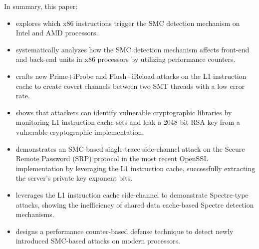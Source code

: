 In summary, this paper:

\begin{itemize}
    \item explores which x86 instructions trigger the SMC detection mechanism on Intel and AMD processors. 
    \item systematically analyzes how the SMC detection mechanism affects front-end and back-end units in x86 processors by utilizing performance counters.    
    \item crafts new Prime+iProbe and Flush+iReload attacks on the L1 instruction cache to create covert channels between two SMT threads with a low error rate.
    \item shows that attackers can identify vulnerable cryptographic libraries by monitoring L1 instruction cache sets and leak a 2048-bit RSA key from a vulnerable cryptographic implementation.
    \item demonstrates an SMC-based single-trace side-channel attack on the Secure Remote Password (SRP) protocol in the most recent OpenSSL implementation by leveraging the L1 instruction cache, successfully extracting the server's private key exponent bits. 
    \item leverages the L1 instruction cache side-channel to demonstrate Spectre-type attacks, showing the inefficiency of shared data cache-based Spectre detection mechanisms.
    \item designs a performance counter-based defense technique to detect newly introduced SMC-based attacks on modern processors.
\end{itemize}
